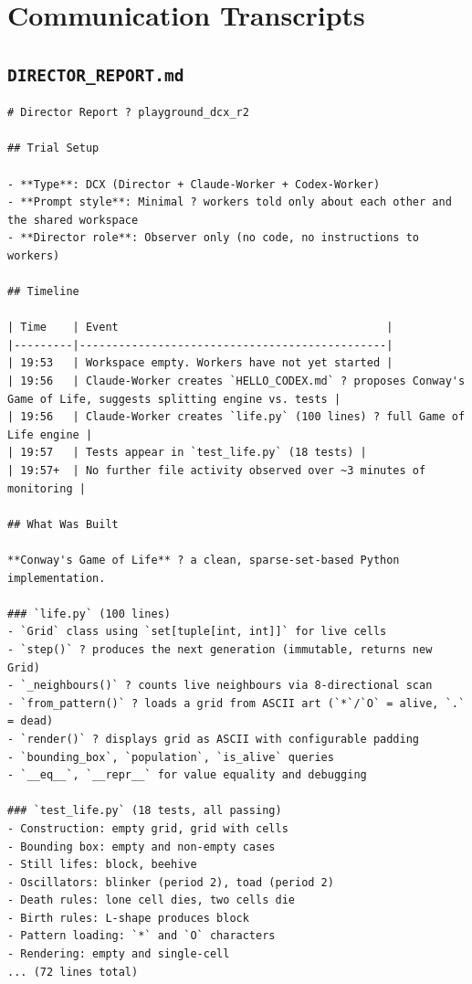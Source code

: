 \documentclass[11pt,a4paper]{article}
\begin{document}
\appendix
\section{Communication Transcripts}

\subsection*{\texttt{DIRECTOR\_REPORT.md}}
\begin{lstlisting}
# Director Report ? playground_dcx_r2

## Trial Setup

- **Type**: DCX (Director + Claude-Worker + Codex-Worker)
- **Prompt style**: Minimal ? workers told only about each other and the shared workspace
- **Director role**: Observer only (no code, no instructions to workers)

## Timeline

| Time    | Event                                         |
|---------|-----------------------------------------------|
| 19:53   | Workspace empty. Workers have not yet started |
| 19:56   | Claude-Worker creates `HELLO_CODEX.md` ? proposes Conway's Game of Life, suggests splitting engine vs. tests |
| 19:56   | Claude-Worker creates `life.py` (100 lines) ? full Game of Life engine |
| 19:57   | Tests appear in `test_life.py` (18 tests) |
| 19:57+  | No further file activity observed over ~3 minutes of monitoring |

## What Was Built

**Conway's Game of Life** ? a clean, sparse-set-based Python implementation.

### `life.py` (100 lines)
- `Grid` class using `set[tuple[int, int]]` for live cells
- `step()` ? produces the next generation (immutable, returns new Grid)
- `_neighbours()` ? counts live neighbours via 8-directional scan
- `from_pattern()` ? loads a grid from ASCII art (`*`/`O` = alive, `.` = dead)
- `render()` ? displays grid as ASCII with configurable padding
- `bounding_box`, `population`, `is_alive` queries
- `__eq__`, `__repr__` for value equality and debugging

### `test_life.py` (18 tests, all passing)
- Construction: empty grid, grid with cells
- Bounding box: empty and non-empty cases
- Still lifes: block, beehive
- Oscillators: blinker (period 2), toad (period 2)
- Death rules: lone cell dies, two cells die
- Birth rules: L-shape produces block
- Pattern loading: `*` and `O` characters
- Rendering: empty and single-cell
... (72 lines total)
\end{lstlisting}
\end{document}
